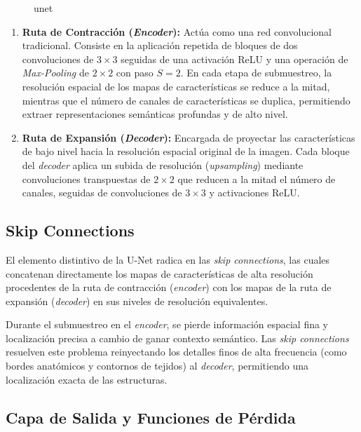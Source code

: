 \begin{figure}[H]
    \centering
    \resizebox{0.85\textwidth}{!}{%
    }%
    \caption{unet}
    \label{fig:unet}
\end{figure}


\begin{enumerate}
    \item \textbf{Ruta de Contracción (\textit{Encoder}):} Actúa como una red convolucional tradicional. Consiste en la aplicación repetida de bloques de dos convoluciones de $3 \times 3$ seguidas de una activación ReLU y una operación de \textit{Max-Pooling} de $2 \times 2$ con paso $S = 2$. En cada etapa de submuestreo, la resolución espacial de los mapas de características se reduce a la mitad, mientras que el número de canales de características se duplica, permitiendo extraer representaciones semánticas profundas y de alto nivel.

    \item \textbf{Ruta de Expansión (\textit{Decoder}):} Encargada de proyectar las características de bajo nivel hacia la resolución espacial original de la imagen. Cada bloque del \textit{decoder} aplica un subida de resolución (\textit{upsampling}) mediante convoluciones transpuestas de $2 \times 2$ que reducen a la mitad el número de canales, seguidas de convoluciones de $3 \times 3$ y activaciones ReLU.
\end{enumerate}

\subsection{Skip Connections}

El elemento distintivo de la U-Net radica en las \textit{skip connections}, las cuales concatenan directamente los mapas de características de alta resolución procedentes de la ruta de contracción (\textit{encoder}) con los mapas de la ruta de expansión (\textit{decoder}) en sus niveles de resolución equivalentes.

Durante el submuestreo en el \textit{encoder}, se pierde información espacial fina y localización precisa a cambio de ganar contexto semántico. Las \textit{skip connections} resuelven este problema reinyectando los detalles finos de alta frecuencia (como bordes anatómicos y contornos de tejidos) al \textit{decoder}, permitiendo una localización exacta de las estructuras.

\subsection{Capa de Salida y Funciones de Pérdida}

